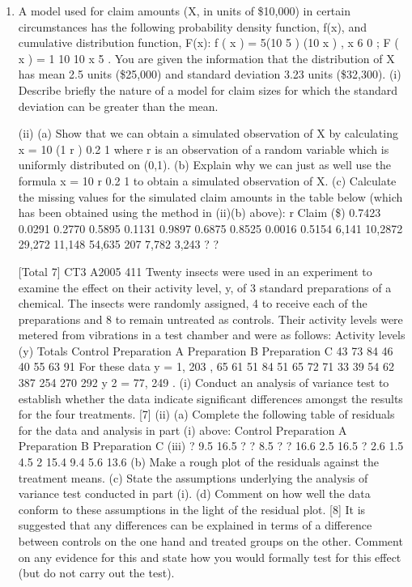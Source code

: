 \documentclass[a4paper,12pt]{article}
\begin{document}
\begin{enumerate}
\item A model used for claim amounts (X, in units of \$10,000) in certain circumstances has
the following probability density function, f(x), and cumulative distribution function,
F(x):
f ( x ) =
5(10 5 )
(10 x )
, x
6
0 ; F ( x ) = 1
10
10 x
5
.
You are given the information that the distribution of X has mean 2.5 units (\$25,000)
and standard deviation 3.23 units (\$32,300).
(i) Describe briefly the nature of a model for claim sizes for which the standard deviation can be greater than the mean.

(ii) (a)
Show that we can obtain a simulated observation of X by calculating
x = 10 (1 r )
0.2
1
where r is an observation of a random variable which is uniformly
distributed on (0,1).
(b)
Explain why we can just as well use the formula
x = 10 r
0.2
1
to obtain a simulated observation of X.
(c)
Calculate the missing values for the simulated claim amounts in the table below (which has been obtained using the method in (ii)(b)
above):
r Claim (\$)
0.7423
0.0291
0.2770
0.5895
0.1131
0.9897
0.6875
0.8525
0.0016
0.5154 6,141
10,2872
29,272
11,148
54,635
207
7,782
3,243
?
?

[Total 7]
CT3 A2005
411
Twenty insects were used in an experiment to examine the effect on their activity
level, y, of 3 standard preparations of a chemical. The insects were randomly
assigned, 4 to receive each of the preparations and 8 to remain untreated as controls.
Their activity levels were metered from vibrations in a test chamber and were as
follows:
Activity levels (y)
Totals
Control
Preparation A
Preparation B
Preparation C 43
73
84
46
40
55
63
91
For these data y = 1, 203 ,
65
61
51
84
51
65
72
71
33
39
54
62
387
254
270
292
y 2 = 77, 249 .
(i) Conduct an analysis of variance test to establish whether the data indicate
significant differences amongst the results for the four treatments.
[7]
(ii) (a)
Complete the following table of residuals for the data and analysis in
part (i) above:
Control
Preparation A
Preparation B
Preparation C
(iii)
?
9.5
16.5
?
?
8.5
?
?
16.6
2.5
16.5
?
2.6
1.5
4.5
2
15.4
9.4
5.6 13.6
(b) Make a rough plot of the residuals against the treatment means.
(c) State the assumptions underlying the analysis of variance test
conducted in part (i).
(d) Comment on how well the data conform to these assumptions in the
light of the residual plot.
[8]
It is suggested that any differences can be explained in terms of a difference
between controls on the one hand and treated groups on the other.
Comment on any evidence for this and state how you would formally test for
this effect (but do not carry out the test).


\end{enumerate}
\end{document}
